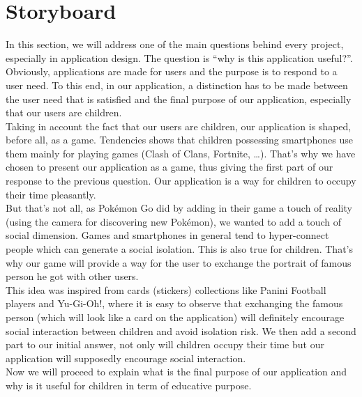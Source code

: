 \documentclass[12pt]{scrartcl}
\begin{document}
	
\section{Storyboard}
	

	In this section, we will address one of the main questions behind every project, especially in application design. The question is ``why is this application useful?”. Obviously, applications are made for users and the purpose is to respond to a user need. To this end, in our application, a distinction has to be made between the user need that is satisfied and the final purpose of our application, especially that our users are children.\\

	Taking in account the fact that our users are children, our application is shaped, before all, as a game. Tendencies shows that children possessing smartphones use them mainly for playing games (Clash of Clans, Fortnite, …). That’s why we have chosen to present our application as a game, thus giving the first part of our response to the previous question. Our application is a way for children to occupy their time pleasantly.\\

	But that’s not all, as Pokémon Go did by adding in their game a touch of reality (using the camera for discovering new Pokémon), we wanted to add a touch of social dimension. Games and smartphones in general tend to hyper-connect people which can generate a social isolation. This is also true for children. That’s why our game will provide a way for the user to exchange the portrait of famous person he got with other users.\\

	This idea was inspired from cards (stickers) collections like Panini Football players and Yu-Gi-Oh!, where it is easy to observe that exchanging the famous person (which will look like a card on the application) will definitely encourage social interaction between children and avoid isolation risk. We then add a second part to our initial answer, not only will children occupy their time but our application will supposedly encourage social interaction.\\

	Now we will proceed to explain what is the final purpose of our application and why is it useful for children in term of educative purpose.\\
\end{document}
